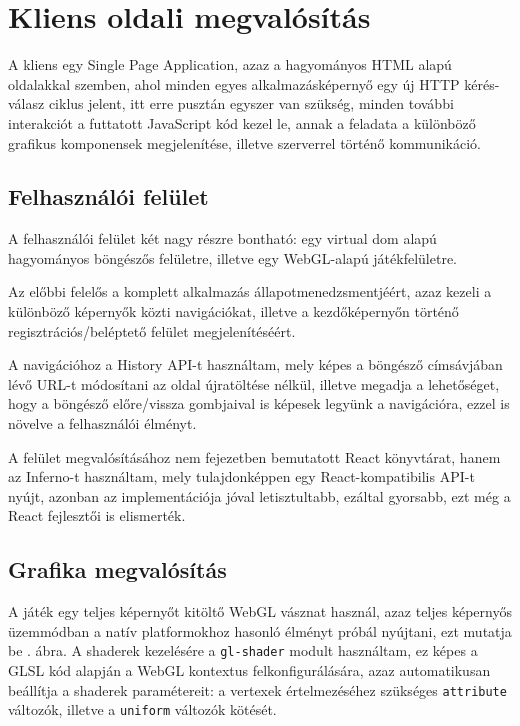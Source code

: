 \section{Kliens oldali megvalósítás}

A kliens egy Single Page Application, azaz a hagyományos HTML alapú oldalakkal
szemben, ahol minden egyes alkalmazásképernyő egy új HTTP kérés-válasz ciklus
jelent, itt erre pusztán egyszer van szükség, minden további interakciót a
futtatott JavaScript kód kezel le, annak a feladata a különböző grafikus
komponensek megjelenítése, illetve szerverrel történő kommunikáció.

\subsection{Felhasználói felület}

A felhasználói felület két nagy részre bontható: egy virtual dom alapú
hagyományos böngészős felületre, illetve egy WebGL-alapú játékfelületre.

Az előbbi felelős a komplett alkalmazás állapotmenedzsmentjéért, azaz kezeli a
különböző képernyők közti navigációkat, illetve a kezdőképernyőn történő
regisztrációs/beléptető felület megjelenítéséért.

A navigációhoz a History API-t\cite{history} használtam, mely képes a böngésző
címsávjában lévő URL-t módosítani az oldal újratöltése nélkül, illetve megadja a
lehetőséget, hogy a böngésző előre/vissza gombjaival is képesek legyünk a
navigációra, ezzel is növelve a felhasználói élményt.

A felület megvalósításához nem  fejezetben bemutatott React
könyvtárat, hanem az Inferno\cite{inferno}-t használtam, mely tulajdonképpen egy
React-kompatibilis API-t nyújt, azonban az implementációja jóval letisztultabb,
ezáltal gyorsabb\cite{bench}, ezt még a React fejlesztői is
elismerték\cite{reactrewrite}.

\subsection{Grafika megvalósítás}

A játék egy teljes képernyőt kitöltő WebGL vásznat használ, azaz teljes
képernyős üzemmódban a natív platformokhoz hasonló élményt próbál nyújtani, ezt
mutatja be . ábra. A shaderek kezelésére a
\texttt{gl-shader} modult használtam, ez képes a GLSL kód alapján a WebGL
kontextus felkonfigurálására, azaz automatikusan beállítja a shaderek
paramétereit: a vertexek értelmezéséhez szükséges \texttt{attribute} változók,
illetve a \texttt{uniform} változók kötését.

